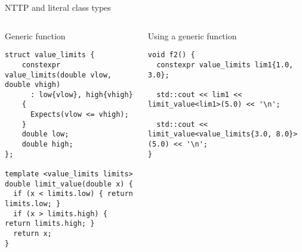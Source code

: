 \begin{frame}[t,fragile]{NTTP and literal class types}
\begin{columns}[T]

\begin{block}{Generic function}
\begin{lstlisting}
struct value_limits {
    constexpr value_limits(double vlow, double vhigh)
      : low{vlow}, high{vhigh} 
    {
      Expects(vlow <= vhigh);
    }
    double low;
    double high;
};

template <value_limits limits>
double limit_value(double x) {
  if (x < limits.low) { return limits.low; }
  if (x > limits.high) { return limits.high; }
  return x;
}
\end{lstlisting}
\end{block}

\begin{block}{Using a generic function}
\begin{lstlisting}[basicstyle=\mode<presentation>{\tiny}]
void f2() {
  constexpr value_limits lim1{1.0, 3.0};
  
  std::cout << lim1 << limit_value<lim1>(5.0) << '\n';

  std::cout << limit_value<value_limits{3.0, 8.0}>(5.0) << '\n';
}
\end{lstlisting}
\end{block}

\end{columns}
\end{frame}
